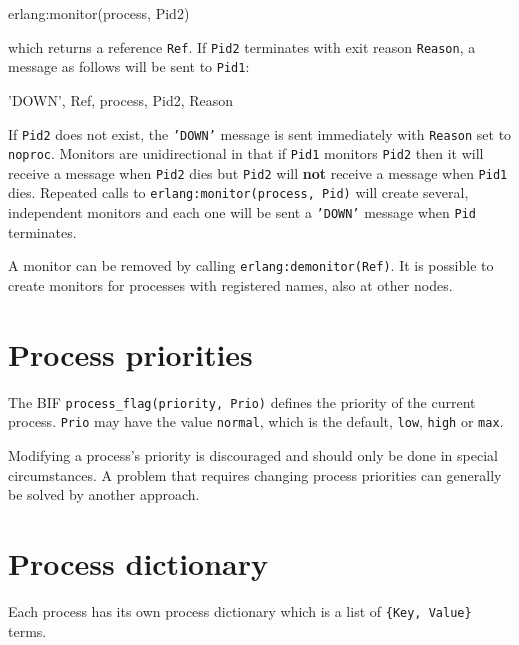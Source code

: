 \begin{erlang}
erlang:monitor(process, Pid2)
\end{erlang}

which returns a reference \texttt{Ref}. If \texttt{Pid2} terminates
with exit reason \texttt{Reason}, a message as follows will be sent to
\texttt{Pid1}:

\begin{erlang}
{'DOWN', Ref, process, Pid2, Reason}
\end{erlang}

If \texttt{Pid2} does not exist, the \texttt{'DOWN'} message is sent
immediately with \texttt{Reason} set to \texttt{noproc}.  Monitors are
unidirectional in that if \texttt{Pid1} monitors \texttt{Pid2} then it
will receive a message when \texttt{Pid2} dies but \texttt{Pid2} will
\textbf{not} receive a message when \texttt{Pid1} dies. Repeated calls
to \texttt{erlang:monitor(process, Pid)} will create several,
independent monitors and each one will be sent a \texttt{'DOWN'} message
when \texttt{Pid} terminates.

A monitor can be removed by calling \texttt{erlang:demonitor(Ref)}. It
is possible to create monitors for processes with registered names,
also at other nodes.


\section{Process priorities}
The BIF \texttt{process\_flag(priority, Prio)} defines the priority of
the current process. \texttt{Prio} may have the value \texttt{normal},
which is the default, \texttt{low}, \texttt{high} or \texttt{max}. 

Modifying a process's priority is discouraged and should only be done in 
special circumstances.  A problem that requires changing process priorities
can generally be solved by another approach.


\section{Process dictionary}
\label{processes:dicts}
Each process has its own process dictionary which is a list of
\texttt{\{Key, Value\}} terms.


